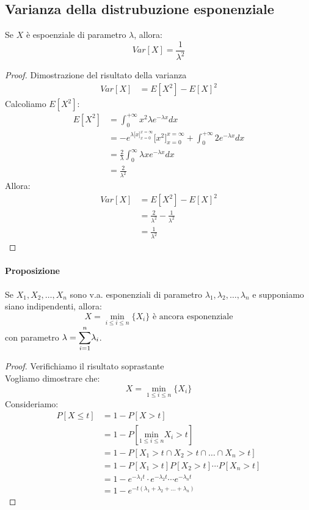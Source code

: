 \documentclass[12pt]{report}
\begin{document}
  	 \subsection{Varianza della distrubuzione esponenziale}
  	 Se $X$ è espoenziale di parametro $\lambda$, allora:
  	 \[
  	 Var[X] = \frac{1}{\lambda^2}
  	 \]
  	 \begin{proof}{Dimostrazione del risultato della varianza} \quad \\
  	 	\begin{align*}
  	 		Var[X] &= E[X^2] - E[X]^2
  	 	\end{align*}
  	 	Calcoliamo $E[X^2]$:
  	 	\begin{align*}
  	 		E[X^2] &= \int_{0}^{+\infty}x^2\lambda e^{-\lambda x}dx \\
  	 		&= -e^{\lambda \big[x\big]^{x=\infty}_{x=0}}\big[x^2\big]^{x=\infty}_{x=0} + \int_{0}^{+\infty}2e^{-\lambda x}dx \\
  	 		&= \frac{2}{\lambda}\int_{0}^{\infty}\lambda xe^{-\lambda x}dx \\
  	 		&= \frac{2}{\lambda^2}
  	 	\end{align*}
  	 	Allora:
  	 	\begin{align*}
  	 	Var[X] &= E[X^2] - E[X]^2 \\
  	 	&= \frac{2}{\lambda^2} - \frac{1}{\lambda^2} \\
  	 	&= \frac{1}{\lambda^2}
  	 	\end{align*}
  	 \end{proof}
  	 \paragraph{Proposizione} Se $X_1, X_2, \dots, X_n$ sono v.a. esponenziali di parametro $\lambda_1, \lambda_2, \dots, \lambda_n$ e supponiamo siano indipendenti, allora:
  	 \[
  	 X = \underset{i \leq i \leq n}{\min}\{X_i\} \text{ è ancora esponenziale}
  	 \]
  	 con parametro $\lambda = \mathlarger{\sum_{i=1}^{n}}\lambda_i$.
  	 \begin{proof}{Verifichiamo il risultato soprastante} \quad \\
  	 	Vogliamo dimostrare che:
  	 	\[
  	 		X = \underset{1 \leq i \leq n}{\min}\{X_i\}
  	 	\]
  	 	Consideriamo:
  	 	\begin{align*}
  	 		P[X \leq t] &= 1 - P[X>t] \\
  	 		&= 1 - P[\underset{1 \leq i \leq n}{\text{min}}X_i > t] \\
  	 		&= 1 - P[X_1 > t \cap X_2 > t \cap \dots \cap X_n > t] \\
  	 		&= 1 - P[X_1 > t]P[X_2 > t] \cdots P[X_n > t] \\
  	 		&= 1 - e^{-\lambda_1t} \cdot e^{-\lambda_2 t} \cdots e^{-\lambda_nt} \\
  	 		&= 1 - e^{-t(\lambda_1 + \lambda_2 + \dots + \lambda_n)}
  	 	\end{align*}
  	 \end{proof}
\end{document}
